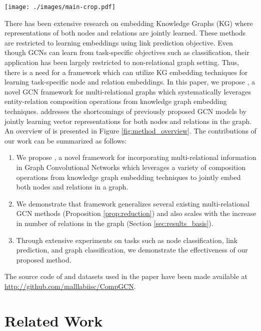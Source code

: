 \documentclass{article} \usepackage{iclr2020_conference,times}
\begin{document}
\begin{figure*}[t]	
	\centering	
	\texttt{[image: ./images/main-crop.pdf]}	
	\caption{\label{fig:method_overview} Overview of \method{}. Given node and relation embeddings, \method{} performs a composition operation $\phi(\cdot)$ over each edge in the neighborhood of a central node (e.g. \textit{Christopher Nolan} above). The composed embeddings are then convolved with specific filters $\bm{W}_O$ and $\bm{W}_I$ for original and inverse relations respectively. We omit self-loop in the diagram for clarity. The message from all the neighbors are then aggregated to get an updated embedding of the central node. Also, the relation embeddings are transformed using a separate weight matrix. Please refer to Section \ref{sec:details} for details.
	}	
\end{figure*}

There has been extensive research on embedding Knowledge Graphs (KG) \citep{survey2016nickel,survey2017} where representations of both nodes and relations are jointly learned. These methods are restricted to learning embeddings using link prediction objective. Even though GCNs can learn from task-specific objectives such as classification, their application has been largely restricted to non-relational graph setting. 
Thus, there is a need for a framework which can utilize KG embedding techniques for learning task-specific node and relation embeddings.  In this paper, we propose \method{}, a novel GCN framework for multi-relational graphs which systematically leverages entity-relation composition operations from knowledge graph embedding techniques.
\method{} addresses the shortcomings of previously proposed GCN models by jointly learning vector representations for both nodes and relations in the graph. An overview of \method{} is presented in Figure \ref{fig:method_overview}.
The contributions of our work can be summarized as follows:

\begin{enumerate}[itemsep=2pt,parsep=0pt,partopsep=0pt,leftmargin=*,topsep=0.2pt]
	\item We propose \method{}, a novel framework for incorporating multi-relational information in Graph Convolutional Networks which leverages a variety of composition operations from knowledge graph embedding techniques to jointly embed both nodes and relations in a graph.
	\item We demonstrate that \method{} framework generalizes several existing multi-relational GCN methods (Proposition \ref{prop:reduction}) and also scales with the increase in number of relations in the graph (Section \ref{sec:results_basis}). 
\item Through extensive experiments on tasks such as node classification, link prediction, and graph classification, we demonstrate the effectiveness of our proposed method.
\end{enumerate} 
\noindent The source code of \method{} and datasets used in the paper have been made available at {\color{blue} \url{http://github.com/malllabiisc/CompGCN}}. \section{Related Work}
\label{sec:related_work}
\end{document}
